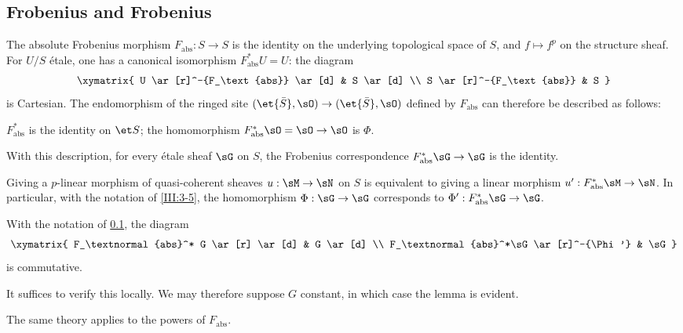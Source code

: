 \documentclass[oneside]{book}
\begin{document}
\subsection{Frobenius and Frobenius}\label{III:3-4}

The absolute Frobenius morphism $F_\text{abs}:S\to S$ is the identity on the
underlying topological space of $S$, and $f\mapsto f^p$ on the structure
sheaf. For $U/S$ étale, one has a canonical isomorphism
$F_\text{abs}^* U=U$: the diagram
\[\xymatrix{
  U \ar[r]^-{F_\text{abs}} \ar[d]
    & S \ar[d] \\
  S \ar[r]^-{F_\text{abs}}
    & S
}\]
is Cartesian. The endomorphism of the ringed site
$(\et{\bar S},\sO)\to(\et{\bar S},\sO)$ defined by $F_\text{abs}$ can
therefore be described as follows:
\begin{center}
  $F_\text{abs}^*$ is the identity on $\et S$; the homomorphism
  $F_\text{abs}^*\sO=\sO\to\sO$ is $\Phi$.
\end{center}
With this description, for every étale sheaf $\sG$ on $S$, the Frobenius
correspondence $F_\text{abs}^*\sG\to\sG$ is the identity.

Giving a $p$-linear morphism of quasi-coherent sheaves
$u:\sM\to\sN$ on $S$ is equivalent to giving a linear morphism
$u':F_\text{abs}^*\sM\to\sN$. In particular, with the notation of
\ref{III:3-5}, the homomorphism $\Phi:\sG\to\sG$ corresponds to
$\Phi':F_\text{abs}^*\sG\to\sG$.






\begin{lemma_}\label{III:3-5}
With the notation of \ref{III:3-4}, the diagram
\[\xymatrix{
  F_\textnormal{abs}^* G \ar[r] \ar[d]
    & G \ar[d] \\
  F_\textnormal{abs}^*\sG \ar[r]^-{\Phi'}
    & \sG
}\]
is commutative.
\end{lemma_}

It suffices to verify this locally. We may therefore suppose $G$ constant, in
which case the lemma is evident.

The same theory applies to the powers of $F_\text{abs}$.






\subsection{}\label{III:3-6}
\end{document}
